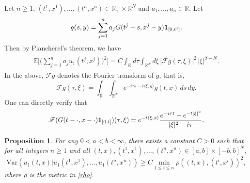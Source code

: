 \documentclass[11pt, reqno]{amsart}
\newtheorem{proposition}[theorem]{Proposition}
\def\R{{\mathbb R}}
\def\E{{\mathbb E}}
\numberwithin{equation}{section}
\begin{document}
Let $n \ge 1$, $(t^1, x^1), \dots, (t^n, x^n) \in \R_+ \times \R^N$ and $a_1, \dots, a_n \in \R$. Let
\[g(s, y) = \sum_{j=1}^n a_j G(t^j - s, x^j - y) {\bf 1}_{[0, t^j]}.\]
Then by Plancherel's theorem, we have
\begin{align}
\begin{aligned}\label{Eq:SHE_var}
\E\Bigg[ \bigg( \sum_{j=1}^n a_j u_1(t^j, x^j) \bigg)^2 \Bigg]
= C \int_{\R} d\tau \int_{\R^N} d\xi \, |\mathscr{F} g(\tau, \xi)|^2\, |\xi|^{\beta - N}.
\end{aligned}
\end{align}
In the above, $\mathscr{F}g$ denotes the Fourier transform of $g$, that is,
\[ \mathscr{F} g(\tau, \xi) = \int_{\R}\int_{\R^N} e^{-i\tau s - i \langle \xi, y \rangle} g(t, x) \,ds\, dy. \]
One can directly verify that
\begin{equation}\label{FT_G}
\mathscr{F}(G(t - \cdot, x- \cdot) {\bf 1}_{[0, t]})(\tau, \xi) 
= e^{-i\langle \xi, x\rangle} \frac{e^{-i\tau t} - e^{-t|\xi|^2}}{|\xi|^2 - i\tau}.
\end{equation}

\begin{proposition}\label{Prop:SHE_SLND}
For any $0 < a < b < \infty$, there exists a constant $C > 0$ such that
for all integers $n \ge 1$ and all $(t, x), (t^1, x^1), \dots, (t^n, x^n) \in [a, b] \times [-b, b]^N$, 
\begin{equation}\label{Eq:SHE_SLND}
\mathrm{Var}\left(u_1(t, x) | u_1(t^1, x^1), \dots, u_1(t^n, x^n)\right) \ge C \min_{1 \le i \le n}\rho((t, x), (t^i, x^i))^2,
\end{equation}
where $\rho$ is the metric in \eqref{rho}.
\end{proposition}
\end{document}

